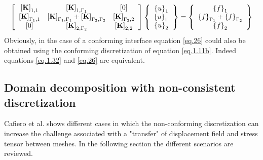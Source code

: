  \begin{equation}
 \label{eq.26}
     \left[ \begin{array}{ccc} 
     \left[{\mathbf{K}}\right]_{1,1} & \left[{\mathbf{K}}\right]_{1,\Gamma_1} & \left[{0}\right] \\
    \left[{\mathbf{K}}\right]_{\Gamma_1,1} & \left[{\mathbf{K}}\right]_{\Gamma_1,\Gamma_1}+ \left[{\mathbf{K}}\right]_{\Gamma_2,\Gamma_2} & \left[{\mathbf{K}}\right]_{\Gamma_2,2}\\   
     \left[{0}\right] & \left[{\mathbf{K}}\right]_{2,\Gamma_2} & \left[{\mathbf{K}}\right]_{2,2}\end{array} \right] \left\lbrace \begin{array}{c} \left\lbrace{u}\right \rbrace_1\\\left\lbrace{u}\right \rbrace_{\Gamma}\\\left\lbrace{u}\right \rbrace_2
     \end{array}\right\rbrace= \left\lbrace\begin{array}{c} \left\lbrace{f}\right \rbrace_1\\\left\lbrace{f}\right \rbrace_{\Gamma_1}+\left\lbrace{f}\right \rbrace_{\Gamma_2}\\\left\lbrace{f}\right \rbrace_2
     \end{array}\right\rbrace
 \end{equation}
 Obviously, in the case of a conforming interface equation \eqref{eq.26} could also be obtained using the conforming discretization of equation \eqref{eq.1.11b}. Indeed equations \eqref{eq.1.32} and \eqref{eq.26} are equivalent.
 \subsection{Domain decomposition with non-consistent discretization}\label{ssec32}
 Cafiero et al.  \cite{cafiero2016domain} shows different cases in which the non-conforming discretization can increase the challenge associated with a "transfer" of displacement field and stress tensor between meshes.
 In the following section the different scenarios are reviewed.
 
